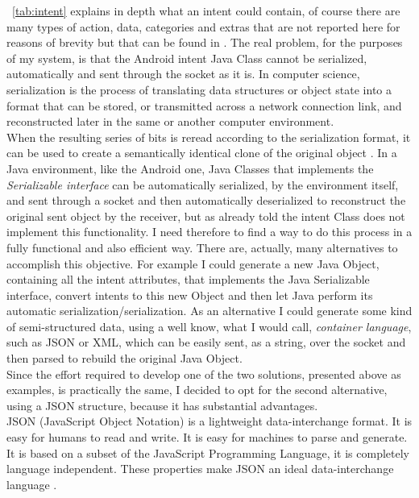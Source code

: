 \tablename~\ref{tab:intent} explains in depth what an intent could contain, of course there are many types of action, data, categories and extras that are not reported here for reasons of brevity but that can be found in \cite{android2017intent}. The real problem, for the purposes of my system, is that the Android intent Java Class cannot be serialized, automatically and sent through the socket as it is. In computer science, serialization is the process of translating data structures or object state into a format that can be stored, or transmitted across a network connection link, and reconstructed later in the same or another computer environment.\\ When the resulting series of bits is reread according to the serialization format, it can be used to create a semantically identical clone of the original object \cite{marshall2015c++}. In a Java environment, like the Android one, Java Classes that implements the \textit{Serializable interface} can be automatically serialized, by the environment itself, and sent through a socket  and then automatically deserialized to reconstruct the original sent object by the receiver, but as already told the intent Class does not implement this functionality. I need therefore to find a way to do this process in a fully functional and also efficient way. There are, actually, many alternatives to accomplish this objective. For example I could generate a new Java Object, containing all the intent attributes, that implements the Java Serializable interface, convert intents to this new Object and then let Java perform its automatic serialization/serialization. As an alternative I could generate some kind of semi-structured data, using a well know, what I would call, \textit{container language}, such as JSON or XML, which can be easily sent, as a string, over the socket and then parsed to rebuild the original Java Object.\\
Since the effort required to develop one of the two solutions, presented above as examples, is practically the same, I decided to opt for the second alternative, using a JSON structure, because it has substantial advantages.\\
JSON (JavaScript Object Notation) is a lightweight data-interchange format. It is easy for humans to read and write. It is easy for machines to parse and generate. It is based on a subset of the JavaScript Programming Language, it is completely language independent. These properties make JSON an ideal data-interchange
language \cite{w3c2007introducing}.\\
